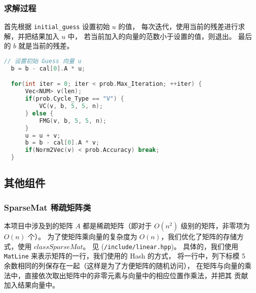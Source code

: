 \documentclass[lang=cn,a4paper,newtx,bibend=bibtex]{elegantpaper}
\begin{document}
\subsubsection{求解过程}

首先根据 \texttt{initial\_guess} 设置初始 $u$ 的值，
每次迭代，使用当前的残差进行求解，并把结果加入 $u$ 中， 
若当前加入的向量的范数小于设置的值，则退出。
最后的 $b$ 就是当前的残差。

\begin{lstlisting}[language=C++]
  // 设置初始 Guess 向量 u
  b = b - cal[0].A * u;

  for(int iter = 0; iter < prob.Max_Iteration; ++iter) {
      Vec<NUM> v(len);
      if(prob.Cycle_Type == "V") {
          VC(v, b, 5, 5, n);
      } else {
          FMG(v, b, 5, 5, n);
      }
      u = u + v;
      b = b - cal[0].A * v;
      if(Norm2Vec(v) < prob.Accuracy) break;
  }
\end{lstlisting}

\subsection{其他组件}

\subsubsection{SparseMat 稀疏矩阵类}

本项目中涉及到的矩阵 $A$ 都是稀疏矩阵（即对于 $O(n^2)$ 级别的矩阵，非零项为 $O(n)$ 个）。
为了使矩阵乘向量的复杂度为 $O(n)$，我们优化了矩阵的存储方式，使用 $class SparseMat$。
见 (\lstinline{/include/linear.hpp})。
具体的，我们使用 \lstinline{MatLine} 来表示矩阵的一行，我们使用的 Hash 的方式，
将一行中，列下标模 5 余数相同的列保存在一起（这样是为了方便矩阵的随机访问），
在矩阵与向量的乘法中，直接依次取出矩阵中的非零元素与向量中的相应位置作乘法，并把其
贡献加入结果向量中。
\end{document}
